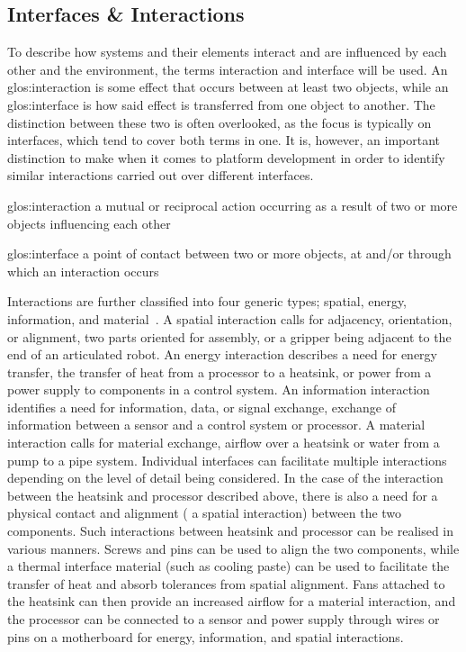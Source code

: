 \subsection{Interfaces \& Interactions}
To describe how systems and their elements interact and are influenced by each other and the environment, the terms interaction and interface will be used.
An \gls{glos:interaction} is some effect that occurs between at least two objects, while an \gls{glos:interface} is how said effect is transferred from one object to another.
The distinction between these two is often overlooked, as the focus is typically on interfaces, which tend to cover both terms in one.
It is, however, an important distinction to make when it comes to platform development in order to identify similar interactions carried out over different interfaces.
\begin{definition}{\gls{glos:interaction}}
a mutual or reciprocal action occurring as a result of two or more objects influencing each other
\end{definition}
\begin{definition}{\gls{glos:interface}}
a point of contact between two or more objects, at and/or through which an interaction occurs
\end{definition}

Interactions are further classified into four generic types; spatial, energy, information, and material~\parencite{Pimmler94integrationanalysis}.
A spatial interaction calls for adjacency, orientation, or alignment, \eg{} two parts oriented for assembly, or a gripper being adjacent to the end of an articulated robot.
An energy interaction describes a need for energy transfer, \eg{} the transfer of heat from a processor to a heatsink, or power from a power supply to components in a control system.
An information interaction identifies a need for information, data, or signal exchange, \eg{} exchange of information between a sensor and a control system or processor.
A material interaction calls for material exchange, \eg{} airflow over a heatsink or water from a pump to a pipe system.
Individual interfaces can facilitate multiple interactions depending on the level of detail being considered.
In the case of the interaction between the heatsink and processor described above, there is also a need for a physical contact and alignment (\ie{} a spatial interaction) between the two components.
Such interactions between heatsink and processor can be realised in various manners.
Screws and pins can be used to align the two components, while a thermal interface material (such as cooling paste) can be used to facilitate the transfer of heat and absorb tolerances from spatial alignment.
Fans attached to the heatsink can then provide an increased airflow for a material interaction, and the processor can be connected to a sensor and power supply through wires or pins on a motherboard for energy, information, and spatial interactions.

